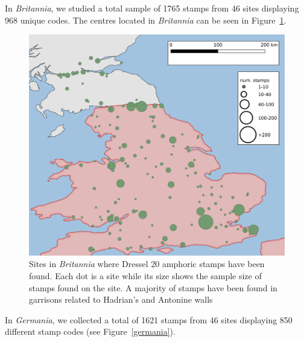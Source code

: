 \documentclass[review]{elsarticle}
\begin{document}
In \textit{Britannia}, we studied a total sample of 1765 stamps from 46 sites displaying 968 unique codes. The centres located in \textit{Britannia} can be seen in Figure~\ref{britannia}.
 
\begin{figure}[htp]
	\centering
\includegraphics[width=\linewidth]{figs/britannia}
\caption{Sites in \textit{Britannia} where Dressel 20 amphoric stamps have been found. Each dot is a site while its size shows the sample size of stamps found on the site. A majority of stamps have been found in garrisons related to Hadrian's and Antonine walls}
\label{britannia}
\end{figure} 



In \textit{Germania}, we collected a total of 1621 stamps from 46 sites displaying 850 different stamp codes (see Figure~\ref{germania}). 
\end{document}
